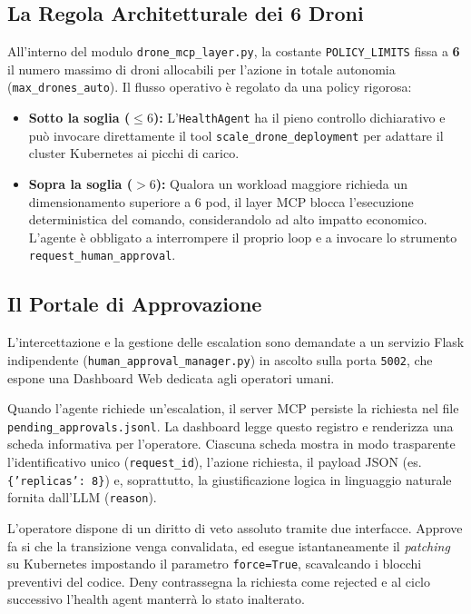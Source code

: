 \subsection*{La Regola Architetturale dei 6 Droni}
All'interno del modulo \texttt{drone\_mcp\_layer.py}, la costante \texttt{POLICY\_LIMITS} fissa a \textbf{6} il numero massimo di droni allocabili per l'azione in totale autonomia (\texttt{max\_drones\_auto}). Il flusso operativo è regolato da una policy rigorosa:
\begin{itemize}
    \item \textbf{Sotto la soglia ($\le 6$):} L'\texttt{HealthAgent} ha il pieno controllo dichiarativo e può invocare direttamente il tool \texttt{scale\_drone\_deployment} per adattare il cluster Kubernetes ai picchi di carico.
    \item \textbf{Sopra la soglia ($> 6$):} Qualora un workload maggiore richieda un dimensionamento superiore a 6 pod, il layer MCP blocca l'esecuzione deterministica del comando, considerandolo ad alto impatto economico. L'agente è obbligato a interrompere il proprio loop e a invocare lo strumento \texttt{request\_human\_approval}.
\end{itemize}

\subsection*{Il Portale di Approvazione}
L'intercettazione e la gestione delle escalation sono demandate a un servizio Flask indipendente (\texttt{human\_approval\_manager.py}) in ascolto sulla porta \texttt{5002}, che espone una Dashboard Web dedicata agli operatori umani. 

Quando l'agente richiede un'escalation, il server MCP persiste la richiesta nel file \texttt{pending\_approvals.jsonl}. La dashboard legge questo registro e renderizza una scheda informativa per l'operatore. Ciascuna scheda mostra in modo trasparente l'identificativo unico (\texttt{request\_id}), l'azione richiesta, il payload JSON (es. \texttt{\{'replicas': 8\}}) e, soprattutto, la giustificazione logica in linguaggio naturale fornita dall'LLM (\texttt{reason}).

L'operatore dispone di un diritto di veto assoluto tramite due interfacce. Approve fa si che la transizione venga convalidata, ed esegue istantaneamente il \textit{patching} su Kubernetes impostando il parametro \texttt{force=True}, scavalcando i blocchi preventivi del codice. Deny contrassegna la richiesta come rejected e al ciclo successivo l'health agent manterrà lo stato inalterato. 
